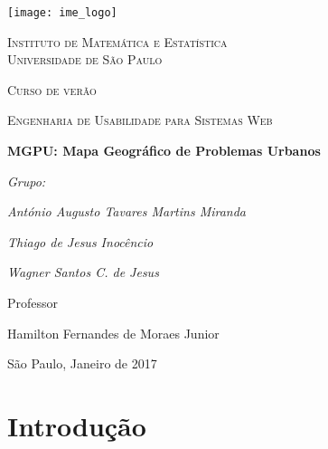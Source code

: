 \documentclass[a4paper,12pt,twoside]{report}
\begin{document}
\thispagestyle{empty}

\begin{titlepage}
  \centering
  \texttt{[image: ime\_logo]}\par\vspace{1cm}
   {\scshape\LARGE Instituto de Matemática e Estatística \\ Universidade de São Paulo \par}
  \vspace{1cm}
  {\scshape\large  Curso de verão \par}
  {\scshape\normalsize  Engenharia de Usabilidade para Sistemas Web\par}
  \vspace{1.5cm}
  {\LARGE\bfseries MGPU: Mapa Geográfico de Problemas Urbanos\par}
  
  \vspace{2cm}
  {\Large\itshape Grupo: \par}
  {\Large\itshape António Augusto Tavares Martins Miranda\par}
  {\Large\itshape Thiago de Jesus Inocêncio\par}
  {\Large\itshape Wagner Santos C. de Jesus\par}
  \vfill
  Professor\par
  Hamilton Fernandes de Moraes Junior

  \vfill

  {\large São Paulo, Janeiro de 2017}
\end{titlepage}

\newpage

\pagestyle{IHA-fancy-style}

\newpage

\tableofcontents

\newpage

\chapter{Introdução}
\end{document}
